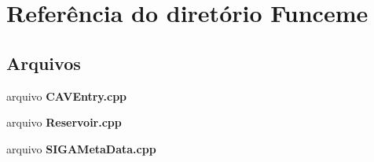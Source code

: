 \section{Referência do diretório Funceme}
\label{dir_246e5c75df554a58410c0621fb40dd19}
\subsection*{Arquivos}
\begin{DoxyCompactItemize}
\item 
arquivo {\bf C\+A\+V\+Entry.\+cpp}
\item 
arquivo {\bf Reservoir.\+cpp}
\item 
arquivo {\bf S\+I\+G\+A\+Meta\+Data.\+cpp}
\end{DoxyCompactItemize}
